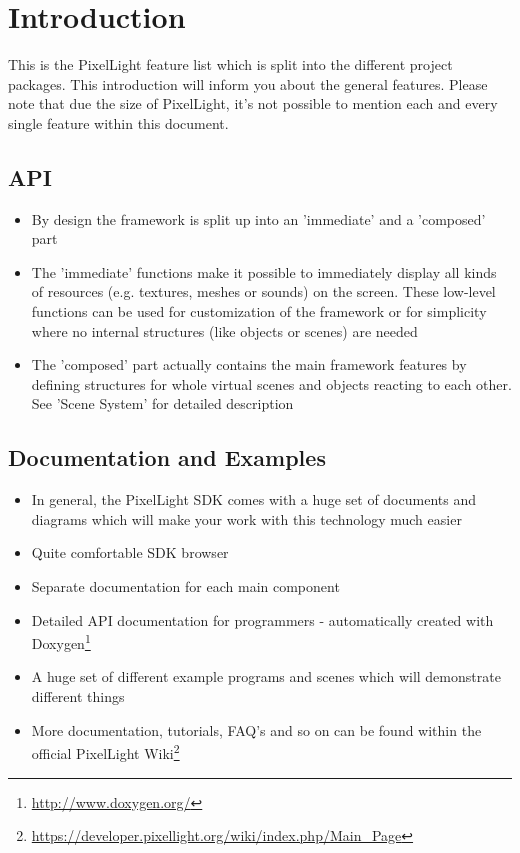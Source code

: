 \chapter{Introduction}
This is the PixelLight feature list which is split into the different project packages. This introduction will inform you about the general features. Please note that due the size of PixelLight, it's not possible to mention each and every single feature within this document.





\section{API}
\begin{itemize}
\item{By design the framework is split up into an 'immediate' and a 'composed' part}
\item{The 'immediate' functions make it possible to immediately display all kinds of resources (e.g. textures, meshes or sounds) on the screen. These low-level functions can be used for customization of the framework or for simplicity where no internal structures (like objects or scenes) are needed}
\item{The 'composed' part actually contains the main framework features by defining structures for whole virtual scenes and objects reacting to each other. See 'Scene System' for detailed description}
\end{itemize}





\section{Documentation and Examples}
\begin{itemize}
\item{In general, the PixelLight SDK comes with a huge set of documents and diagrams which will make your work with this technology much easier}
\item{Quite comfortable SDK browser}
\item{Separate documentation for each main component}
\item{Detailed API documentation for programmers - automatically created with Doxygen\footnote{\url{http://www.doxygen.org/}}}
\item{A huge set of different example programs and scenes which will demonstrate different things}
\item{More documentation, tutorials, FAQ's and so on can be found within the official PixelLight Wiki\footnote{\url{https://developer.pixellight.org/wiki/index.php/Main_Page}}}
\end{itemize}






